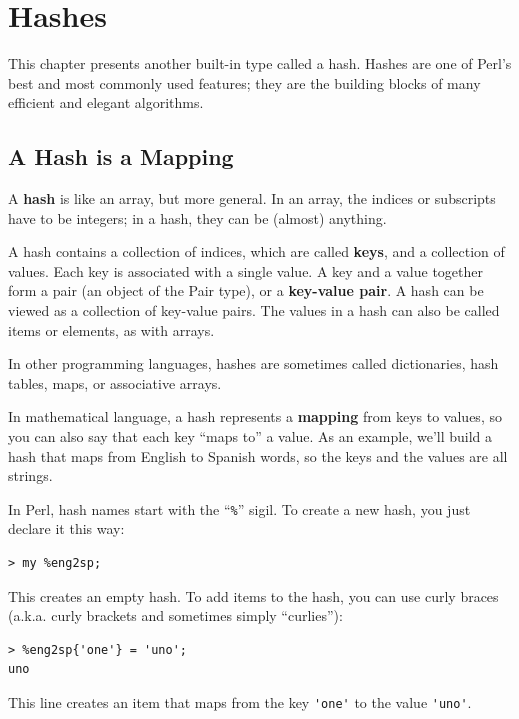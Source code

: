 
\chapter{Hashes}
\label{hashes}

This chapter presents another built-in type called a hash. 
Hashes are one of Perl's best and most commonly used 
features; they are the building blocks of many efficient 
and elegant algorithms.


\section{A Hash is a Mapping}
\label{hash_descr}

A {\bf hash} is like an array, but more general.  In an 
array, the indices or subscripts have to be integers; in a hash, 
they can be (almost) anything.

A hash contains a collection of indices, which are called 
{\bf keys}, and a collection of values.  Each key is associated with a single value.  A key and a value together form a pair 
(an object of the Pair type), or a {\bf key-value pair}. A 
hash can be viewed as a collection of key-value pairs. The 
values in a hash can also be called items or elements, as with arrays.

In other programming languages, hashes are sometimes called 
dictionaries, hash tables, maps, or associative arrays.

In mathematical language, a hash represents a {\bf mapping}
from keys to values, so you can also say that each key
``maps to'' a value. As an example, we'll build a hash that 
maps from English to Spanish words, so the keys and the 
values are all strings.

In Perl, hash names start with the ``\verb"%"'' sigil. To create 
a new hash, you just declare it this way:

\begin{verbatim}
> my %eng2sp;
\end{verbatim}

This creates an empty hash. To add items to the hash, 
you can use curly braces (a.k.a. curly brackets and 
sometimes simply ``curlies''):

\begin{verbatim}
> %eng2sp{'one'} = 'uno';
uno
\end{verbatim}
%
This line creates an item that maps from the key
\verb"'one'" to the value \verb"'uno'".  

